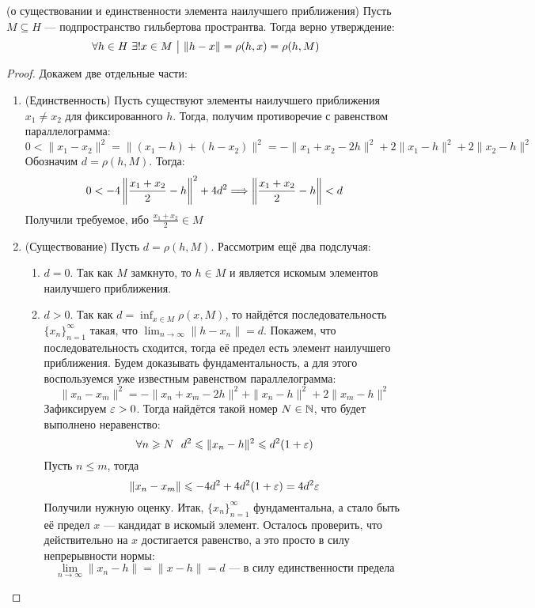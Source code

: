 \begin{lemma} (о существовании и единственности элемента наилучшего приближения)
	Пусть $M \subseteq H$ --- подпространство гильбертова пространтва. Тогда верно утверждение:
	\[
		\forall h \in H\ \exists! x \in M \ \big|\  \|h - x\| = \rho(h, x) = \rho(h, M)
	\]
\end{lemma}

\begin{proof}
	Докажем две отдельные части:
	\begin{enumerate}
		\item (Единственность) Пусть существуют элементы наилучшего приближения $x_1 \neq x_2$ для фиксированного $h$. Тогда, получим противоречие с равенством параллелограмма:
		\[
			0 < \|x_1 - x_2\|^2 = \|(x_1 - h) + (h - x_2)\|^2 = -\|x_1 + x_2 - 2h\|^2 + 2\|x_1 - h\|^2 + 2\|x_2 - h\|^2
		\]
		Обозначим $d = \rho(h, M)$. Тогда:
		\[
			0 < -4\left\|\frac{x_1 + x_2}{2} - h\right\|^2 + 4d^2 \Longrightarrow \left\|\frac{x_1 + x_2}{2} - h\right\| < d
		\]
		Получили требуемое, ибо $\frac{x_1 + x_2}{2} \in M$
		
		\item (Существование) Пусть $d = \rho(h, M)$. Рассмотрим ещё два подслучая:
		\begin{enumerate}
			\item $d = 0$. Так как $M$ замкнуто, то $h \in M$ и является искомым элементов наилучшего приближения.
			
			\item $d > 0$. Так как $d = \inf_{x \in M} \rho(x, M)$, то найдётся последовательность $\{x_n\}_{n = 1}^\infty$ такая, что $\lim_{n \to \infty} \|h - x_n\| = d$. Покажем, что последовательность сходится, тогда её предел есть элемент наилучшего приближения. Будем доказывать фундаментальность, а для этого воспользуемся уже известным равенством параллелограмма:
			\[
				\|x_n - x_m\|^2 = -\|x_n + x_m - 2h\|^2 + \|x_n - h\|^2 + 2\|x_m - h\|^2
			\]
			Зафиксируем $\varepsilon > 0$. Тогда найдётся такой номер $N \in \mathbb{N}$, что будет выполнено неравенство:
			\[
				\forall n \geqslant N\ \ d^2 \leqslant \|x_n - h\|^2 \leqslant d^2(1 + \varepsilon)
			\]
			Пусть $n \le m$, тогда
			\[
				\|x_n - x_m\| \leqslant -4d^2 + 4d^2(1 + \varepsilon) = 4d^2\varepsilon
			\]
			Получили нужную оценку. Итак, $\{x_n\}_{n = 1}^\infty$ фундаментальна, а стало быть её предел $x$ --- кандидат в искомый элемент. Осталось проверить, что действительно на $x$ достигается равенство, а это просто в силу непрерывности нормы:
			\[
				\lim_{n \to \infty} \|x_n - h\| = \|x - h\| = d \text{ --- в силу единственности предела}
			\]
		\end{enumerate}
	\end{enumerate}
\end{proof}

